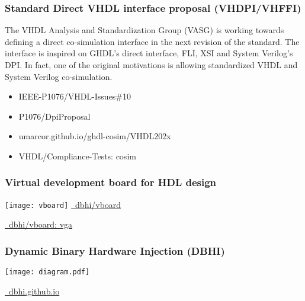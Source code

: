 \documentclass[xcolor={usenames,dvipsnames}]{beamer}
\begin{document}
\begin{frame}
\frametitle{Standard Direct VHDL interface proposal (VHDPI/VHFFI) }

The VHDL Analysis and Standardization Group (VASG) is working towards defining a direct co-simulation interface in the
next revision of the standard.
The interface is inspired on GHDL's direct interface, FLI, XSI and System Verilog's DPI.
In fact, one of the original motivations is allowing standardized VHDL and System Verilog co-simulation.

\vfill

\begin{itemize}
\item IEEE-P1076/VHDL-Issues\#10 \href{https://gitlab.com/IEEE-P1076/VHDL-Issues/-/issues/10}{\faGitlab}
\item P1076/DpiProposal \href{http://www.eda-twiki.org/cgi-bin/view.cgi/P1076/DpiProposal}{\faGlobe}
\item umarcor.github.io/ghdl-cosim/VHDL202x \href{https://umarcor.github.io/ghdl-cosim/vhdl202x/}{\faGlobe}
\item VHDL/Compliance-Tests: cosim \href{https://github.com/VHDL/Compliance-Tests/tree/master/cosim}{\faCode}
\end{itemize}
\end{frame}

\begin{frame}
\frametitle{Virtual development board for HDL design}
\centering
\vfill
\texttt{[image: vboard]}
\vfill
\Large \href{https://github.com/dbhi/vboard}{\faGithub~dbhi/vboard}

\href{https://github.com/dbhi/vboard/tree/main/vga}{\faCode~dbhi/vboard: vga}
\vfill
\end{frame}

\begin{frame}
\frametitle{Dynamic Binary Hardware Injection (DBHI)}
\centering
\texttt{[image: diagram.pdf]}

\vfill
\Large\href{https://dbhi.github.io/}{\faGlobe~dbhi.github.io}
\end{frame}
\end{document}
